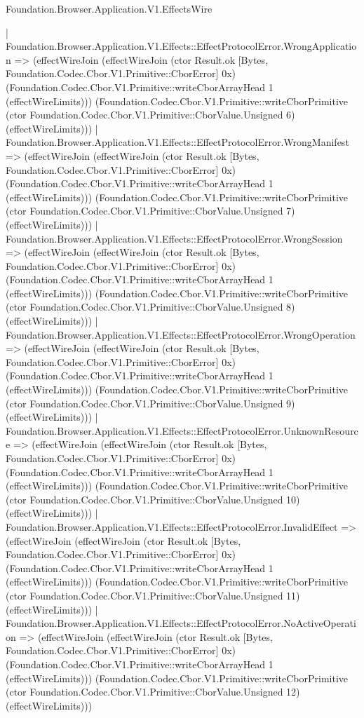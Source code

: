 \begin{lexlean}{Foundation.Browser.Application.V1.EffectsWire}
\begin{semanticmodule}
{    | Foundation.Browser.Application.V1.Effects::EffectProtocolError.WrongApplication => (effectWireJoin (effectWireJoin (ctor Result.ok [Bytes, Foundation.Codec.Cbor.V1.Primitive::CborError] 0x) (Foundation.Codec.Cbor.V1.Primitive::writeCborArrayHead 1 (effectWireLimits))) (Foundation.Codec.Cbor.V1.Primitive::writeCborPrimitive (ctor Foundation.Codec.Cbor.V1.Primitive::CborValue.Unsigned 6) (effectWireLimits)))
    | Foundation.Browser.Application.V1.Effects::EffectProtocolError.WrongManifest => (effectWireJoin (effectWireJoin (ctor Result.ok [Bytes, Foundation.Codec.Cbor.V1.Primitive::CborError] 0x) (Foundation.Codec.Cbor.V1.Primitive::writeCborArrayHead 1 (effectWireLimits))) (Foundation.Codec.Cbor.V1.Primitive::writeCborPrimitive (ctor Foundation.Codec.Cbor.V1.Primitive::CborValue.Unsigned 7) (effectWireLimits)))
    | Foundation.Browser.Application.V1.Effects::EffectProtocolError.WrongSession => (effectWireJoin (effectWireJoin (ctor Result.ok [Bytes, Foundation.Codec.Cbor.V1.Primitive::CborError] 0x) (Foundation.Codec.Cbor.V1.Primitive::writeCborArrayHead 1 (effectWireLimits))) (Foundation.Codec.Cbor.V1.Primitive::writeCborPrimitive (ctor Foundation.Codec.Cbor.V1.Primitive::CborValue.Unsigned 8) (effectWireLimits)))
    | Foundation.Browser.Application.V1.Effects::EffectProtocolError.WrongOperation => (effectWireJoin (effectWireJoin (ctor Result.ok [Bytes, Foundation.Codec.Cbor.V1.Primitive::CborError] 0x) (Foundation.Codec.Cbor.V1.Primitive::writeCborArrayHead 1 (effectWireLimits))) (Foundation.Codec.Cbor.V1.Primitive::writeCborPrimitive (ctor Foundation.Codec.Cbor.V1.Primitive::CborValue.Unsigned 9) (effectWireLimits)))
    | Foundation.Browser.Application.V1.Effects::EffectProtocolError.UnknownResource => (effectWireJoin (effectWireJoin (ctor Result.ok [Bytes, Foundation.Codec.Cbor.V1.Primitive::CborError] 0x) (Foundation.Codec.Cbor.V1.Primitive::writeCborArrayHead 1 (effectWireLimits))) (Foundation.Codec.Cbor.V1.Primitive::writeCborPrimitive (ctor Foundation.Codec.Cbor.V1.Primitive::CborValue.Unsigned 10) (effectWireLimits)))
    | Foundation.Browser.Application.V1.Effects::EffectProtocolError.InvalidEffect => (effectWireJoin (effectWireJoin (ctor Result.ok [Bytes, Foundation.Codec.Cbor.V1.Primitive::CborError] 0x) (Foundation.Codec.Cbor.V1.Primitive::writeCborArrayHead 1 (effectWireLimits))) (Foundation.Codec.Cbor.V1.Primitive::writeCborPrimitive (ctor Foundation.Codec.Cbor.V1.Primitive::CborValue.Unsigned 11) (effectWireLimits)))
    | Foundation.Browser.Application.V1.Effects::EffectProtocolError.NoActiveOperation => (effectWireJoin (effectWireJoin (ctor Result.ok [Bytes, Foundation.Codec.Cbor.V1.Primitive::CborError] 0x) (Foundation.Codec.Cbor.V1.Primitive::writeCborArrayHead 1 (effectWireLimits))) (Foundation.Codec.Cbor.V1.Primitive::writeCborPrimitive (ctor Foundation.Codec.Cbor.V1.Primitive::CborValue.Unsigned 12) (effectWireLimits)))
}
\end{semanticmodule}
\end{lexlean}
